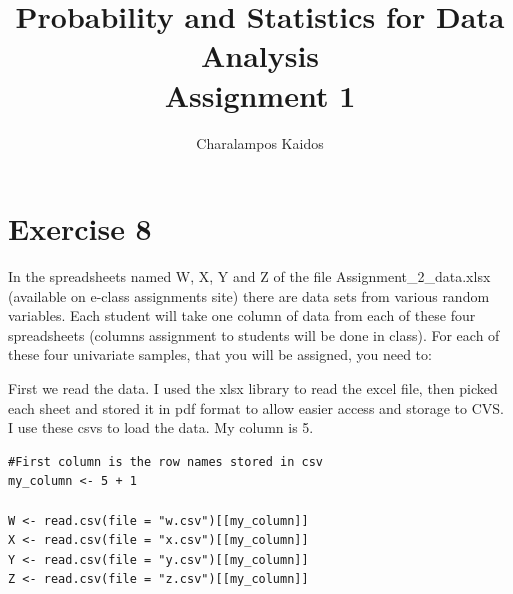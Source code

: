 \documentclass{article}
\begin{document}
\lstset{language=R}

\title{Probability and Statistics for Data Analysis\\Assignment 1}
\author{Charalampos Kaidos}

\maketitle

\section*{Exercise 8}

In the spreadsheets named W, X, Y and Z of the file Assignment\_2\_data.xlsx
(available on e-class assignments site) there are data sets from various random
variables. Each student will take one column of data from each of these four
spreadsheets (columns assignment to students will be done in class). For each of
these four univariate samples, that you will be assigned, you need to:

First we read the data. I used the xlsx library to read the excel file, then
picked each sheet and stored it in pdf format to allow easier access and storage
to CVS. I use these csvs to load the data. My column is 5.

\begin{lstlisting}
#First column is the row names stored in csv
my_column <- 5 + 1 

W <- read.csv(file = "w.csv")[[my_column]]
X <- read.csv(file = "x.csv")[[my_column]]
Y <- read.csv(file = "y.csv")[[my_column]]
Z <- read.csv(file = "z.csv")[[my_column]]
\end{lstlisting}
\end{document}
